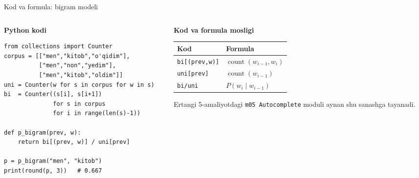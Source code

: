 \documentclass[aspectratio=169,11pt]{beamer}
\begin{document}
\begin{frame}[fragile]{Kod va formula: bigram modeli}
\scriptsize

\begin{columns}[T,totalwidth=\textwidth]
\begin{column}{0.58\textwidth}
\textbf{Python kodi}

\begin{tcolorbox}[defbox,left=2mm,right=2mm,top=1mm,bottom=1mm]
\begin{verbatim}
from collections import Counter
corpus = [["men","kitob","o'qidim"],
          ["men","non","yedim"],
          ["men","kitob","oldim"]]
uni = Counter(w for s in corpus for w in s)
bi  = Counter((s[i], s[i+1])
              for s in corpus
              for i in range(len(s)-1))

def p_bigram(prev, w):
    return bi[(prev, w)] / uni[prev]

p = p_bigram("men", "kitob")
print(round(p, 3))   # 0.667
\end{verbatim}
\end{tcolorbox}
\end{column}

\begin{column}{0.40\textwidth}
\textbf{Kod va formula mosligi}

\begin{tabular}{@{}l l@{}}
\toprule
\textbf{Kod} & \textbf{Formula} \\
\midrule
\texttt{bi[(prev,w)]} & $\operatorname{count}(w_{i-1},w_i)$ \\
\texttt{uni[prev]}    & $\operatorname{count}(w_{i-1})$ \\
\texttt{bi/uni}       & $P(w_i\mid w_{i-1})$ \\
\bottomrule
\end{tabular}

\vspace{6pt}

\begin{tcolorbox}[okbox,left=2mm,right=2mm,top=1mm,bottom=1mm]
\scriptsize
Ertangi 5-amaliyotdagi \texttt{m05 Autocomplete} moduli aynan shu sanashga tayanadi.
\end{tcolorbox}
\end{column}
\end{columns}

\end{frame}
\end{document}
